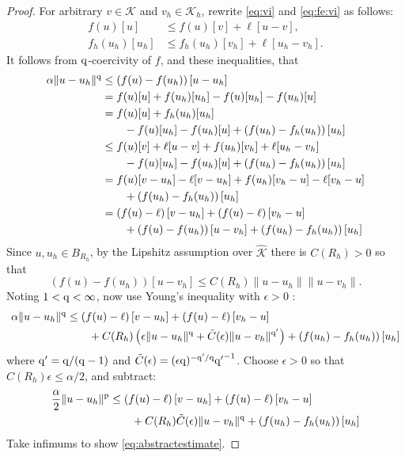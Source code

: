 \documentclass[hidelinks,onefignum,onetabnum,final]{siamart220329}  %
\newcommand{\eps}{\epsilon}
\newcommand{\cK}{\mathcal{K}}
\newcommand{\hcK}{\widehat{\cK}}
\newcommand{\pp}{{\text{\textnormal{p}}}}
\newcommand{\qq}{{\text{\textnormal{q}}}}
\begin{document}
\begin{proof}  For arbitrary $v\in\cK$ and $v_h\in\cK_h$, rewrite \eqref{eq:vi} and \eqref{eq:fe:vi} as follows:
\begin{align*}
f(u)[u]     &\le f(u)[v] + \ell[u-v],  \\
f_h(u_h)[u_h] &\le f_h(u_h)[v_h] + \ell[u_h-v_h].
\end{align*}
It follows from $\qq$-coercivity of $f$, and these inequalities, that
\begin{align*}
\alpha \|u-u_h\|^\qq &\le \left(f(u)-f(u_h)\right)[u-u_h] \\
  &= f(u)[u] + f(u_h)[u_h] - f(u)[u_h] - f(u_h)[u] \\
  &= f(u)[u] + f_h(u_h)[u_h] \\
  &\qquad - f(u)[u_h] - f(u_h)[u] + \left(f(u_h)-f_h(u_h)\right)[u_h] \\
  &\le f(u)[v] + \ell[u-v] + f(u_h)[v_h] + \ell[u_h-v_h] \\
  &\qquad - f(u)[u_h] - f(u_h)[u] + \left(f(u_h)-f_h(u_h)\right)[u_h] \\
  &= f(u)[v-u_h] - \ell[v-u_h] + f(u_h)[v_h-u] - \ell[v_h-u] \\
  &\qquad + \left(f(u_h)-f_h(u_h)\right)[u_h] \\
  &= \left(f(u)-\ell\right)[v-u_h] + \left(f(u)-\ell\right)[v_h-u] \\
  &\qquad + \left(f(u)-f(u_h)\right)[u-v_h] + \left(f(u_h)-f_h(u_h)\right)[u_h]
\end{align*}
Since $u,u_h\in B_{R_h}$, by the Lipshitz assumption over $\hcK$ there is $C(R_h)>0$ so that
    $$\left(f(u)-f(u_h)\right)[u-v_h] \le C(R_h) \|u-u_h\|\|u-v_h\|.$$
Noting $1<\qq<\infty$, now use Young's inequality with $\eps>0$ \cite[Appendix B.2]{Evans2010}:
\begin{align*}
\alpha \|u-u_h\|^\qq &\le \left(f(u)-\ell\right)[v-u_h] + \left(f(u)-\ell\right)[v_h-u] \\
  &\qquad + C(R_h) \left(\eps\|u-u_h\|^\qq + \tilde C(\eps) \|u-v_h\|^{\qq'}\right) + \left(f(u_h)-f_h(u_h)\right)[u_h]
\end{align*}
where $\qq'=\qq/(\qq-1)$ and $\tilde C(\eps) = (\eps \qq)^{-\qq'/\qq} {\qq'}^{-1}$.  Choose $\eps>0$ so that $C(R_h) \eps \le \alpha/2$, and subtract:
\begin{align*}
\frac{\alpha}{2} \|u-u_h\|^\pp &\le \left(f(u)-\ell\right)[v-u_h] + \left(f(u)-\ell\right)[v_h-u] \\
  &\qquad + C(R_h) \tilde C(\eps) \|u-v_h\|^\qq + \left(f(u_h)-f_h(u_h)\right)[u_h]
\end{align*}
Take infimums to show \eqref{eq:abstractestimate}.
\end{proof}
\end{document}
